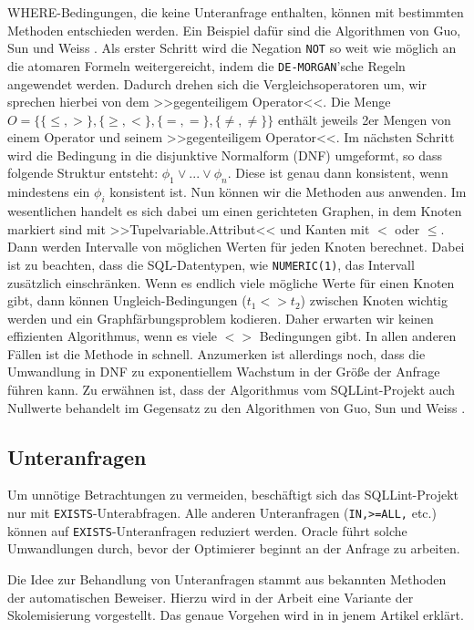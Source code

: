 WHERE-Bedingungen, die keine Unteranfrage enthalten, können mit bestimmten Methoden entschieden werden. Ein Beispiel dafür sind die Algorithmen von Guo, Sun und Weiss \cite{decideable1}. Als erster Schritt wird die Negation \verb|NOT| so weit wie möglich an die atomaren Formeln weitergereicht, indem die \verb|DE-MORGAN|'sche Regeln angewendet werden. Dadurch drehen sich die Vergleichsoperatoren um, wir sprechen hierbei von dem >>gegenteiligem Operator<<. Die Menge $O=\{ \{\leq,>\} , \{\geq,<\} , \{ =, =\}, \{\neq,\neq\} \}$ enthält jeweils 2er Mengen von einem Operator und seinem >>gegenteiligem Operator<<. Im nächsten Schritt wird die Bedingung in die disjunktive Normalform (DNF) umgeformt, so dass folgende Struktur entsteht: $\phi_1 \vee ... \vee \phi_n$. Diese ist genau dann konsistent, wenn mindestens ein $\phi_i$ konsistent ist. Nun können wir die Methoden aus \cite{decideable1} anwenden. Im wesentlichen handelt es sich dabei um einen gerichteten Graphen, in dem Knoten markiert sind mit >>Tupelvariable.Attribut<< und Kanten mit $<$ oder $\leq$. Dann werden Intervalle von möglichen Werten für jeden Knoten berechnet. Dabei ist zu beachten, dass die SQL-Datentypen, wie \verb|NUMERIC(1)|, das Intervall zusätzlich einschränken.
Wenn es endlich viele mögliche Werte für einen Knoten gibt, dann können Ungleich-Bedingungen ($t_1<>t_2$) zwischen Knoten wichtig werden und ein Graphfärbungsproblem kodieren. Daher erwarten wir keinen effizienten Algorithmus, wenn es viele $<>$ Bedingungen gibt. In allen anderen Fällen ist die Methode in \cite{decideable1} schnell. Anzumerken ist allerdings noch, dass die Umwandlung in DNF zu exponentiellem Wachstum in der Größe der Anfrage führen kann. Zu erwähnen ist, dass der Algorithmus vom SQLLint-Projekt auch Nullwerte behandelt im Gegensatz zu den Algorithmen von Guo, Sun und Weiss \cite{decideable1}.

\subsection{Unteranfragen}

Um unnötige Betrachtungen zu vermeiden, beschäftigt sich das SQLLint-Projekt nur mit \verb|EXISTS|-Unterabfragen. Alle anderen Unteranfragen (\verb|IN,>=ALL,| etc.) können auf \verb|EXISTS|-Unteranfragen reduziert werden. Oracle führt solche Umwandlungen durch, bevor der Optimierer beginnt an der Anfrage zu arbeiten.

Die Idee zur Behandlung von Unteranfragen stammt aus bekannten Methoden der automatischen Beweiser. Hierzu wird in der Arbeit \cite{brass1} eine Variante der Skolemisierung vorgestellt. Das genaue Vorgehen wird in in jenem Artikel erklärt.

